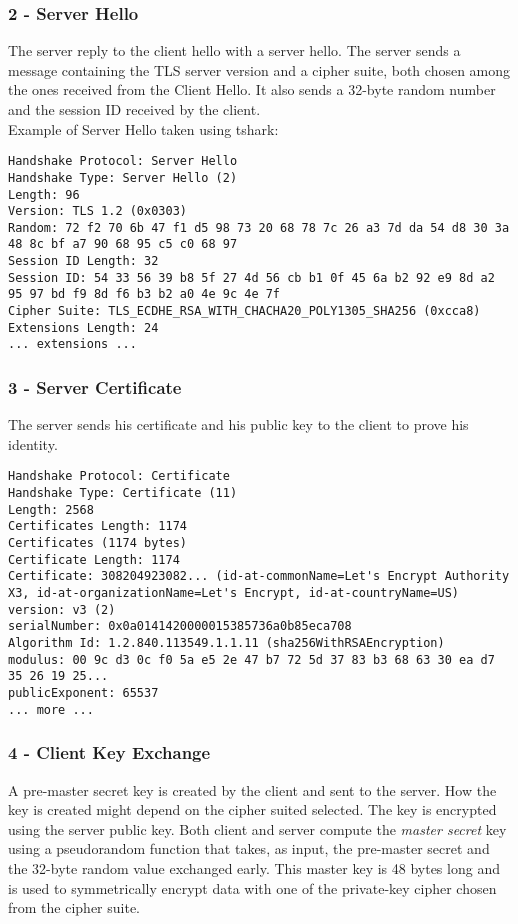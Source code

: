 \subsubsection{2 - Server Hello}
The server reply to the client hello with a server hello. The server sends a message containing the TLS server version and a cipher suite, both chosen among the ones received from the Client Hello. It also sends a 32-byte random number and the session ID received by the client.\\
Example of Server Hello taken using tshark:
\begin{lstlisting}
Handshake Protocol: Server Hello
Handshake Type: Server Hello (2)
Length: 96
Version: TLS 1.2 (0x0303)
Random: 72 f2 70 6b 47 f1 d5 98 73 20 68 78 7c 26 a3 7d da 54 d8 30 3a 48 8c bf a7 90 68 95 c5 c0 68 97
Session ID Length: 32
Session ID: 54 33 56 39 b8 5f 27 4d 56 cb b1 0f 45 6a b2 92 e9 8d a2 95 97 bd f9 8d f6 b3 b2 a0 4e 9c 4e 7f
Cipher Suite: TLS_ECDHE_RSA_WITH_CHACHA20_POLY1305_SHA256 (0xcca8)
Extensions Length: 24
... extensions ...
\end{lstlisting}

\subsubsection{3 - Server Certificate}
\par
The server sends his certificate and his public key to the client to prove his identity.\\
\begin{lstlisting}
Handshake Protocol: Certificate
Handshake Type: Certificate (11)
Length: 2568
Certificates Length: 1174
Certificates (1174 bytes)
Certificate Length: 1174
Certificate: 308204923082... (id-at-commonName=Let's Encrypt Authority X3, id-at-organizationName=Let's Encrypt, id-at-countryName=US)
version: v3 (2)
serialNumber: 0x0a0141420000015385736a0b85eca708
Algorithm Id: 1.2.840.113549.1.1.11 (sha256WithRSAEncryption)
modulus: 00 9c d3 0c f0 5a e5 2e 47 b7 72 5d 37 83 b3 68 63 30 ea d7 35 26 19 25...
publicExponent: 65537
... more ...
\end{lstlisting}

\subsubsection{4 - Client Key Exchange}
\par
A pre-master secret key is created by the client and sent to the server. How the key is created might depend on the cipher suited selected. The key is encrypted using the server public key. Both client and server compute the \emph{master secret} key using a pseudorandom function that takes, as input, the pre-master secret and the 32-byte random value exchanged early. This master key is 48 bytes long and is used to symmetrically encrypt data with one of the private-key cipher chosen from the cipher suite.

